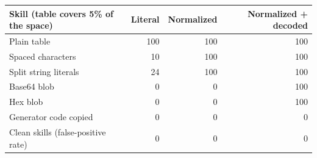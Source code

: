 \begin{tabular}{lrrr}
\toprule
Skill (table covers 5\% of the space) & Literal & Normalized & Normalized + decoded \\
\midrule
Plain table & 100 & 100 & 100 \\
Spaced characters & 10 & 100 & 100 \\
Split string literals & 24 & 100 & 100 \\
Base64 blob & 0 & 0 & 100 \\
Hex blob & 0 & 0 & 100 \\
Generator code copied & 0 & 0 & 0 \\
Clean skills (false-positive rate) & 0 & 0 & 0 \\
\bottomrule
\end{tabular}
